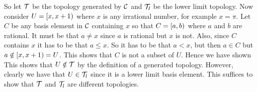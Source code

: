 {{    So let $\mathcal{T}$ be the topology generated by $\mathcal{C}$ and $\mathcal{T}_l$ be the lower limit topology.
    Now consider $U = [x, x+1)$ where $x$ is any irrational number, for example $x = \pi$.
    Let $C$ be any basis element in $\mathcal{C}$ containing $x$ so that $C = [a,b)$ where $a$ and $b$ are rational.
    It must be that $a \neq x$ since $a$ is rational but $x$ is not.
    Also, since $C$ contains $x$ it has to be that $a \leq x$.
    So it has to be that $a < x$, but then $a \in C$ but $a \notin [x, x+1) = U$.
    This shows that $C$ is not a subset of $U$.
    Hence we have shown
    This shows that $U \notin \mathcal{T}$ by the definition of a generated topology.
    However, clearly we have that $U \in \mathcal{T}_l$ since it is a lower limit basis element.
    This suffices to show that $\mathcal{T}$ and $\mathcal{T}_l$ are different topologies.
  }
}
